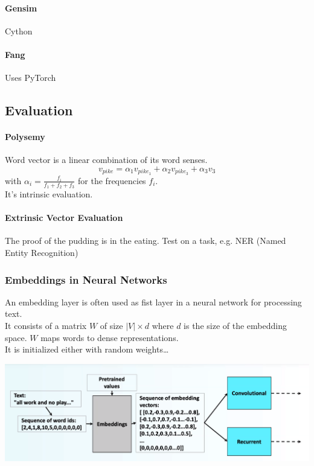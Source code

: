 \documentclass[10pt]{report}
\begin{document}
\paragraph{Gensim} Cython
\paragraph{Fang} Uses PyTorch
\subsection{Evaluation}
\paragraph{Polysemy} Word vector is a linear combination of its word senses.
$$v_{pike} = \alpha_1v_{pike_1} + \alpha_2v_{pike_3} + \alpha_3v_3$$
with $\alpha_i = \frac{f_i}{f_1+f_2+f_3}$ for the frequencies $f_i$.\\
It's intrinsic evaluation.
\paragraph{Extrinsic Vector Evaluation} The proof of the pudding is in the eating. Test on a task, e.g. NER (Named Entity Recognition)
\subsubsection{Embeddings in Neural Networks} An embedding layer is often used as fist layer in a neural network for processing text.\\
It consists of a matrix $W$ of size $|V|\times d$ where $d$ is the size of the embedding space. $W$ maps words to dense representations.\\
It is initialized either with random weights\ldots %
\begin{center}
	\includegraphics[scale=0.5]{7.png}
\end{center}
\end{document}
